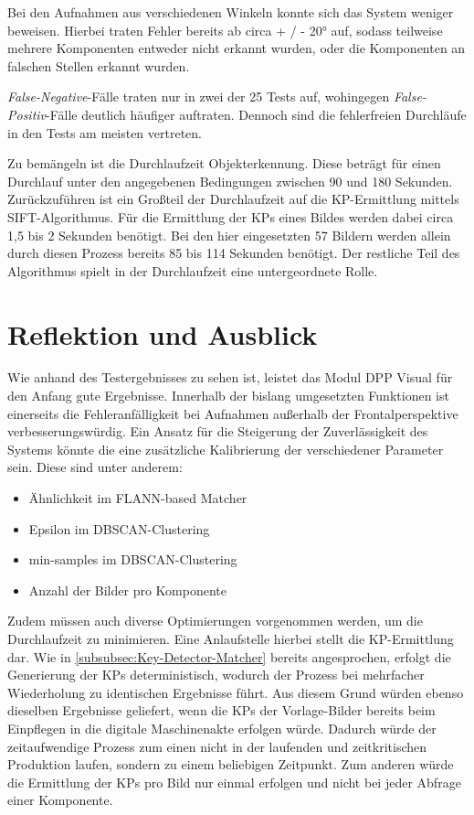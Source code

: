 \documentclass[
    type=Prakikumsbericht,
    status=draft, %
    language=german, %
    bibengine=bibtex,
]{unibwm-inf-thesis}
\begin{document}
    Bei den Aufnahmen aus verschiedenen Winkeln konnte sich das System weniger beweisen.
    Hierbei traten Fehler bereits ab circa + / - 20° auf, sodass teilweise mehrere Komponenten entweder nicht erkannt wurden, oder die Komponenten an falschen Stellen erkannt wurden.

    \textit{False-Negative}-Fälle traten nur in zwei der 25 Tests auf, wohingegen \textit{False-Positiv}-Fälle deutlich häufiger auftraten.
    Dennoch sind die fehlerfreien Durchläufe in den Tests am meisten vertreten.

    Zu bemängeln ist die Durchlaufzeit Objekterkennung.
    Diese beträgt für einen Durchlauf unter den angegebenen Bedingungen zwischen 90 und 180 Sekunden.
    Zurückzuführen ist ein Großteil der Durchlaufzeit auf die \ac{KP}-Ermittlung mittels \ac{SIFT}-Algorithmus.
    Für die Ermittlung der \acp{KP} eines Bildes werden dabei circa 1,5 bis 2 Sekunden benötigt.
    Bei den hier eingesetzten 57 Bildern werden allein durch diesen Prozess bereits 85 bis 114 Sekunden benötigt.
    Der restliche Teil des Algorithmus spielt in der Durchlaufzeit eine untergeordnete Rolle.


    \section{Reflektion und Ausblick}
    Wie anhand des Testergebnisses zu sehen ist, leistet das Modul \ac{DPP} Visual für den Anfang gute Ergebnisse.
    Innerhalb der bislang umgesetzten Funktionen ist einerseits die Fehleranfälligkeit bei Aufnahmen außerhalb der Frontalperspektive verbesserungswürdig.
    Ein Ansatz für die Steigerung der Zuverlässigkeit des Systems könnte die eine zusätzliche Kalibrierung der verschiedener Parameter sein.
    Diese sind unter anderem:
    \begin{itemize}
        \item Ähnlichkeit im \ac{FLANN}-based Matcher
        \item Epsilon im \ac{DBSCAN}-Clustering
        \item min-samples im \ac{DBSCAN}-Clustering
        \item Anzahl der Bilder pro Komponente
    \end{itemize}

    Zudem müssen auch diverse Optimierungen vorgenommen werden, um die Durchlaufzeit zu minimieren.
    Eine Anlaufstelle hierbei stellt die \ac{KP}-Ermittlung dar.
    Wie in \autoref{subsubsec:Key-Detector-Matcher} bereits angesprochen, erfolgt die Generierung der \acp{KP} deterministisch, wodurch der Prozess bei mehrfacher Wiederholung zu identischen Ergebnisse führt.
    Aus diesem Grund würden ebenso dieselben Ergebnisse geliefert, wenn die \acp{KP} der Vorlage-Bilder bereits beim Einpflegen in die digitale Maschinenakte erfolgen würde.
    Dadurch würde der zeitaufwendige Prozess zum einen nicht in der laufenden und zeitkritischen Produktion laufen, sondern zu einem beliebigen Zeitpunkt.
    Zum anderen würde die Ermittlung der \acp{KP} pro Bild nur einmal erfolgen und nicht bei jeder Abfrage einer Komponente.
\end{document}
